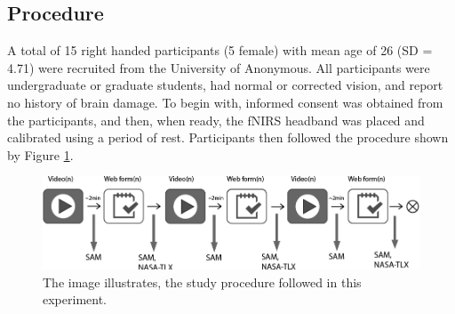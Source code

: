 \documentclass[../main/Feedback.tex]{subfiles}
\begin{document}

\subsection{Procedure}
A total of 15 right handed participants (5 female) with mean age of 26 (SD = 4.71) were recruited from the University of Anonymous.
All participants were undergraduate or graduate students, had normal or corrected vision, and report no history of brain damage. %
To begin with, informed consent was obtained from the participants, and then, when ready, the fNIRS headband was placed and calibrated using a period of rest. Participants then followed the procedure shown by Figure \ref{fig:study-procedure}. 


\begin{figure}[h]
	\centering
	\includegraphics[width=\linewidth]{../figures/study-procedure}
	\caption[study procedure]{The image illustrates, the study procedure followed in this experiment.}
	\label{fig:study-procedure}
\end{figure}
\end{document}

